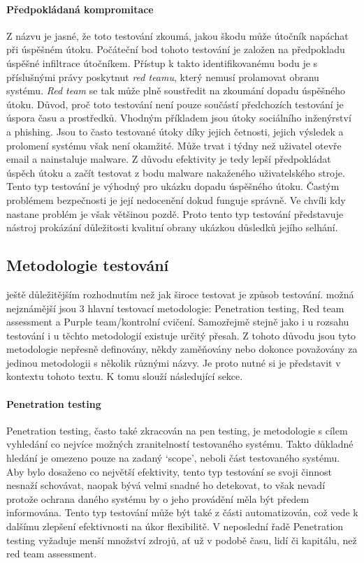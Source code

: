 \paragraph{Předpokládaná kompromitace}
Z názvu je jasné, že toto testování zkoumá, jakou škodu může útočník napáchat při úspěšném útoku.
Počáteční bod tohoto testování je založen na předpokladu úspěšné infiltrace útočníkem.
Přístup k takto identifikovanému bodu je s příslušnými právy poskytnut \textit{red teamu}, který nemusí prolamovat obranu systému.
\textit{Red team} se tak může plně soustředit na zkoumání dopadu úspěšného útoku.
Důvod, proč toto testování není pouze součástí předchozích testování je úspora času a prostředků.
Vhodným příkladem jsou útoky sociálního inženýrství a phishing.
Jsou to často testované útoky díky jejich četnosti, jejich výsledek a prolomení systému však není okamžité.
Může trvat i týdny než uživatel otevře email a nainstaluje malware.\cite{red_team_oakley_2019}
Z důvodu efektivity je tedy lepší předpokládat úspěch útoku a začít testovat z bodu malware nakaženého uživatelského stroje.
Tento typ testování je výhodný pro ukázku dopadu úspěšného útoku.
Častým problémem bezpečnosti je její nedocenění dokud funguje správně.
Ve chvíli kdy nastane problém je však většinou pozdě.
Proto tento typ testování představuje nástroj prokázání důležitosti kvalitní obrany ukázkou důsledků jejího selhání.

\subsection{Metodologie testování}
ještě důležitějším rozhodnutím než jak široce testovat je způsob testování.
možná nejznámější jsou 3 hlavní testovací metodologie: Penetration testing, Red team assessment a Purple team/kontrolní cvičení.
Samozřejmě stejně jako i u rozsahu testování i u těchto metodologií existuje určitý přesah.
Z tohoto důvodu jsou tyto metodologie nepřesně definovány, někdy zaměňovány nebo dokonce považovány za jedinou metodologii s několik různými názvy.
Je proto nutné si je představit v kontextu tohoto textu.
K tomu slouží následující sekce.\cite{securityInteligence_pen_test_red_team_purple_team}

\paragraph{Penetration testing}

Penetration testing, často také zkracován na pen testing, je metodologie s cílem vyhledání co nejvíce možných zranitelností testovaného systému.
Takto důkladné hledání je omezeno pouze na zadaný `scope', neboli část testovaného systému.
Aby bylo dosaženo co největší efektivity, tento typ testování se svoji činnost nesnaží schovávat, naopak bývá velmi snadné ho detekovat, to však nevadí protože ochrana daného systému by o jeho provádění měla být předem informována.
Tento typ testování může být také z části automatizován, což vede k dalšímu zlepšení efektivnosti na úkor flexibilitě.
V neposlední řadě Penetration testing vyžaduje menší množství zdrojů, ať už v podobě času, lidí či kapitálu, než red team assessment.

